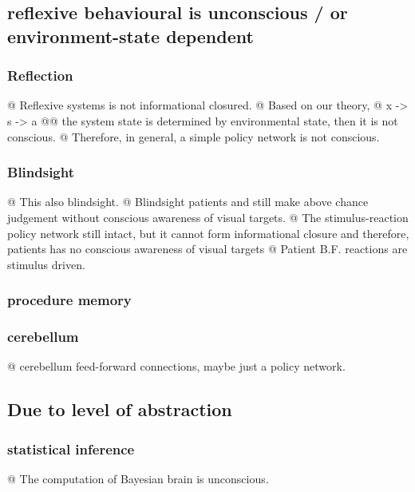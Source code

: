 \documentclass[utf8]{article}
\newenvironment{ants}
			{
			 \begin{easylist}[itemize]
			}
			{
			\end{easylist}
			}
\newcommand{\needref}[1]{%
			\ifthenelse{\equal{#1}{}}{%
				\todo[color=White, linecolor=BlueViolet]{\textcolor{BlueViolet}{Ref}}}{%
				\todo[color=White, linecolor=BlueViolet]{\textcolor{BlueViolet}{Ref: #1}}%
				}%
		}
\begin{document}
		
	
		\subsection{reflexive behavioural is unconscious / or environment-state dependent}	
			\subsubsection{Reflection}
				\begin{ants}
					@ Reflexive systems is not informational closured. 
					@ Based on our theory, 
					@ x -> s -> a
						@@ the system state is determined by environmental state, then it is not conscious. 
					@ Therefore, in general, a simple policy network is not conscious. 
				\end{ants}
		
			\subsubsection{Blindsight}
				\begin{ants}
					@ This also blindsight. 
					@ Blindsight patients and still make above chance judgement without conscious awareness of visual targets.
					@ The stimulus-reaction policy network still intact, but it cannot form informational closure and therefore, patients has no conscious awareness of visual  targets
					@ Patient B.F. reactions are stimulus driven. 
				\end{ants}
		
			\subsubsection{procedure memory}
			
			\subsubsection{cerebellum}
				\begin{ants}
					@ cerebellum feed-forward connections, maybe just a policy network.\needref{cerebellum} 
				\end{ants}
				
		\subsection{Due to level of abstraction}
			\subsubsection{statistical inference}
				\begin{ants}
					@ The computation of Bayesian brain is unconscious.			 
				\end{ants}
			
\end{document}
